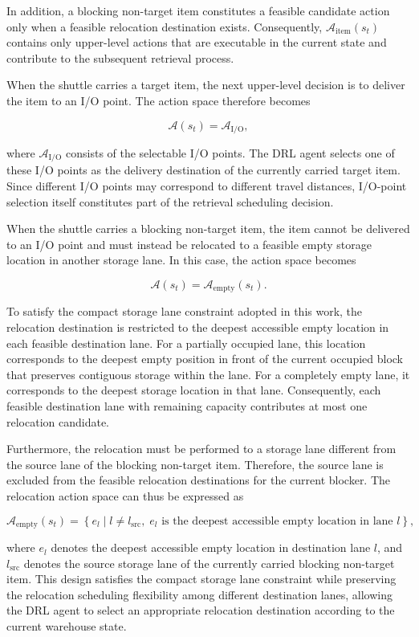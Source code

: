 In addition, a blocking non-target item constitutes a feasible candidate action only when a feasible relocation destination exists. Consequently, $\mathcal{A}_{\mathrm{item}}(s_t)$ contains only upper-level actions that are executable in the current state and contribute to the subsequent retrieval process.

When the shuttle carries a target item, the next upper-level decision is to deliver the item to an I/O point. The action space therefore becomes

\[
\mathcal{A}(s_t)=\mathcal{A}_{\mathrm{I/O}},
\]

where $\mathcal{A}_{\mathrm{I/O}}$ consists of the selectable I/O points. The DRL agent selects one of these I/O points as the delivery destination of the currently carried target item. Since different I/O points may correspond to different travel distances, I/O-point selection itself constitutes part of the retrieval scheduling decision.

When the shuttle carries a blocking non-target item, the item cannot be delivered to an I/O point and must instead be relocated to a feasible empty storage location in another storage lane. In this case, the action space becomes

\[
\mathcal{A}(s_t)=\mathcal{A}_{\mathrm{empty}}(s_t).
\]

To satisfy the compact storage lane constraint adopted in this work, the relocation destination is restricted to the deepest accessible empty location in each feasible destination lane. For a partially occupied lane, this location corresponds to the deepest empty position in front of the current occupied block that preserves contiguous storage within the lane. For a completely empty lane, it corresponds to the deepest storage location in that lane. Consequently, each feasible destination lane with remaining capacity contributes at most one relocation candidate.

Furthermore, the relocation must be performed to a storage lane different from the source lane of the blocking non-target item. Therefore, the source lane is excluded from the feasible relocation destinations for the current blocker. The relocation action space can thus be expressed as

\[
\mathcal{A}_{\mathrm{empty}}(s_t)
=
\left\{
e_l
\mid
l \neq l_{\mathrm{src}},
\;
e_l \text{ is the deepest accessible empty location in lane } l
\right\},
\]

where $e_l$ denotes the deepest accessible empty location in destination lane $l$, and $l_{\mathrm{src}}$ denotes the source storage lane of the currently carried blocking non-target item. This design satisfies the compact storage lane constraint while preserving the relocation scheduling flexibility among different destination lanes, allowing the DRL agent to select an appropriate relocation destination according to the current warehouse state.

